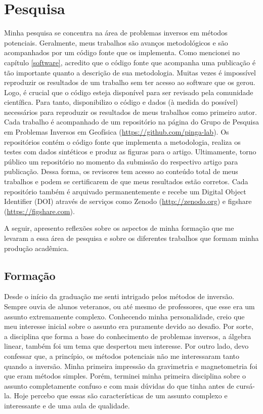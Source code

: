 \section{Pesquisa}

Minha pesquisa se concentra na área de problemas inversos em métodos
potenciais.
Geralmente, meus trabalhos são avanços metodológicos e são acompanhados por
um código fonte que os implementa.
Como mencionei no capítulo \ref{software}, acredito que o código fonte que
acompanha uma publicação é tão importante quanto a descrição de sua
metodologia.
Muitas vezes é impossível reproduzir os resultados de um trabalho
sem ter acesso ao software que os gerou.
Logo, é crucial que o código esteja disponível para ser revisado pela
comunidade científica.
Para tanto, disponibilizo o código e dados (à medida do possível) necessários
para reproduzir os resultados de meus trabalhos como primeiro autor.
Cada trabalho é acompanhado de um repositório na página do Grupo de Pesquisa em
Problemas Inversos em Geofísica (\url{https://github.com/pinga-lab}).
Os repositórios contém o código fonte que implementa a metodologia, realiza os
testes com dados sintéticos e produz as figuras para o artigo.
Ultimamente, torno público um repositório no momento da submissão do respectivo
artigo para publicação.
Dessa forma, os revisores tem acesso ao conteúdo total de meus trabalhos e
podem se certificarem de que meus resultados estão corretos.
Cada repositório também é arquivado permanentemente e recebe um Digital Object
Identifier (DOI) através de serviços como Zenodo (\url{http://zenodo.org}) e
figshare (\url{https://figshare.com}).

A seguir, apresento reflexões sobre os aspectos de minha formação que me
levaram a essa área de pesquisa e sobre os diferentes trabalhos que formam
minha produção acadêmica.


\subsection{Formação}

Desde o início da graduação me senti intrigado pelos métodos de inversão.
Sempre ouvia de alunos veteranos, ou até mesmo de professores, que esse era um
assunto extremamente complexo.
Conhecendo minha personalidade, creio que meu interesse inicial sobre o assunto
era puramente devido ao desafio.
Por sorte, a disciplina que forma a base do conhecimento de problemas inversos,
a álgebra linear, também foi um tema que despertou meu interesse.
Por outro lado, devo confessar que, a princípio, os métodos potenciais não me
interessaram tanto quando a inversão.
Minha primeira impressão da gravimetria e magnetometria foi que eram métodos
simples.
Porém, terminei minha primeira disciplina sobre o assunto completamente confuso
e com mais dúvidas do que tinha antes de cursá-la.
Hoje percebo que essas são características de um assunto complexo e
interessante e de uma aula de qualidade.

